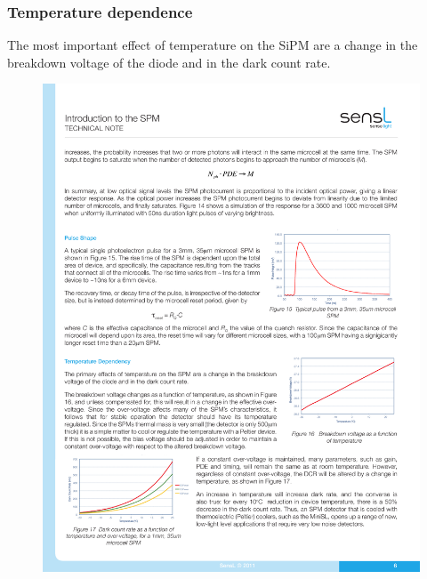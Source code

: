 \subsubsection*{Temperature dependence}

The most important effect of temperature on the SiPM are a change in the breakdown voltage of the diode and in the dark count rate.

\begin{figure}[!bhtp]
	\centering
	\includegraphics[scale=0.9]{img/VbTdep.pdf}

\end{figure}
